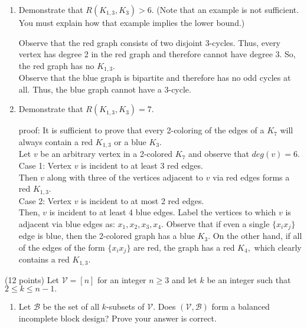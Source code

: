\documentclass[11pt]{article}
\newcommand{\vertex}{\node[vertex]}
\def\be{\begin{enumerate}}
\def\ee{\end{enumerate}}
\begin{document}
\begin{enumerate}
	\item Demonstrate that $R(K_{1,3},K_3)>6.$ (Note that an example is not sufficient. You must explain how that example implies the lower bound.)\\
	
	
	
	Observe that the red graph consists of two disjoint 3-cycles. Thus, every vertex has degree 2 in the red graph and therefore cannot have degree 3. So, the red graph has no $K_{1,3}.$\\
	Observe that the blue graph is bipartite and therefore has no odd cycles at all. Thus, the blue graph cannot have a 3-cycle.\\
	
	\item Demonstrate that $R(K_{1,3},K_3)=7.$ 	
	
	proof: It is sufficient to prove that every 2-coloring of the edges of a $K_7$ will always contain a red $K_{1,3}$ or a blue $K_3.$\\
	Let $v$ be an arbitrary vertex in a 2-colored $K_7$ and observe that $deg(v)=6.$\\
	Case 1: Vertex $v$ is incident to at least 3 red edges. \\
	Then $v$ along with three of the vertices adjacent to $v$ via red edges forms a red $K_{1,3}.$\\
	
	Case 2: Vertex $v$ is incident to at most 2 red edges. \\
	Then, $v$ is incident to at least 4 blue edges. Label the vertices to which $v$ is adjacent via blue edges as: $x_1,x_2,x_3,x_4.$ Observe that if even a single $\{x_ix_j\}$ edge is blue, then the 2-colored graph has a blue $K_3.$ On the other hand, if all of the edges of the form $\{x_ix_j\}$ are red, the graph has a red $K_4,$ which clearly contains a red $K_{1,3}.$\\
	
	\ee
\newpage
\item (12 points) Let $\mathcal{V} =[n]$ for an integer $n\geq 3$ and let $k$ be an integer such that $2 \leq k \leq n-1.$
	\be
	\item Let $\mathcal{B}$ be the set of all $k$-subsets of $\mathcal{V}.$ Does $(\mathcal{V},\mathcal{B})$ form a balanced incomplete block design? Prove your answer is correct.\\
	

\end{enumerate}
\end{document}
